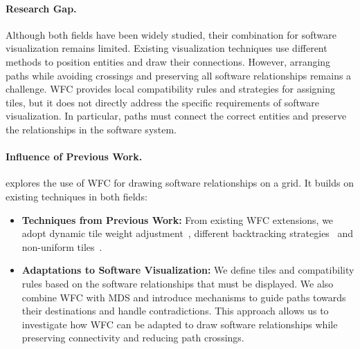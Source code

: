 \documentclass[../../main.tex]{subfiles}
\begin{document}
\paragraph{Research Gap.}
Although both fields have been widely studied, their combination for software visualization remains limited. Existing visualization techniques use different methods to position entities and draw their connections. However, arranging paths while avoiding crossings and preserving all software relationships remains a challenge. WFC provides local compatibility rules and strategies for assigning tiles, but it does not directly address the specific requirements of software visualization. In particular, paths must connect the correct entities and preserve the relationships in the software system.

\paragraph{Influence of Previous Work.}
\wassis explores the use of WFC for drawing software relationships on a grid. It builds on existing techniques in both fields:
\begin{itemize}
    \item \textbf{Techniques from Previous Work:} From existing WFC extensions, we adopt dynamic tile weight adjustment~, different backtracking strategies~ and non-uniform tiles~.

    \item \textbf{Adaptations to Software Visualization:} We define tiles and compatibility rules based on the software relationships that must be displayed. We also combine WFC with MDS and introduce mechanisms to guide paths towards their destinations and handle contradictions. This approach allows us to investigate how WFC can be adapted to draw software relationships while preserving connectivity and reducing path crossings.
\end{itemize}
\end{document}
